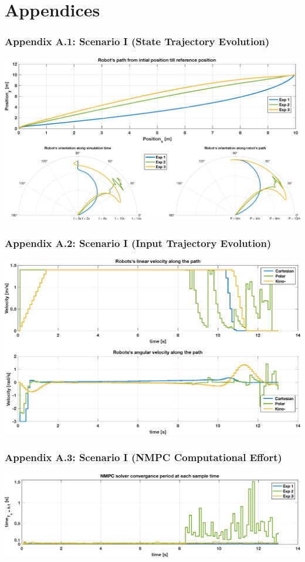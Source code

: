 \section*{Appendices}

	\begin{frame}
		\frametitle{Appendix A.1: Scenario \textrm{I} (State Trajectory Evolution)}\label{a.1}
		\centering
		\includegraphics[scale=0.45]{pictures/graphs/sn1_states.eps}
	\end{frame}

	\begin{frame}
		\frametitle{Appendix A.2: Scenario \textrm{I} (Input Trajectory Evolution)}\label{a.2}
		\centering
		\includegraphics[scale=0.42]{pictures/graphs/sn1_inputs.eps}
	\end{frame}

	\begin{frame}
		\frametitle{Appendix A.3: Scenario \textrm{I} (NMPC Computational Effort)}\label{a.3}
		\centering
		\includegraphics[scale=0.42]{pictures/graphs/sn1_solver_time.eps}
	\end{frame}
 
